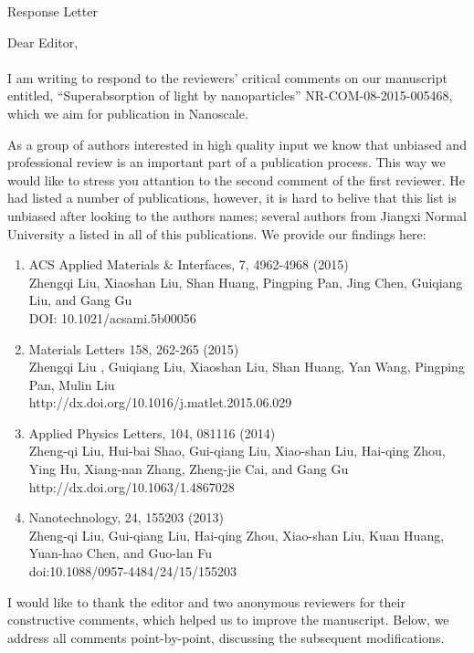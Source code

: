 \documentclass[a4paper]{article}
\begin{document}
\begin{center}
  Response Letter
\end{center}
Dear Editor,
\\
\\
I am writing to respond to the reviewers' critical comments on our
manuscript entitled, ``Superabsorption of light by nanoparticles''
NR-COM-08-2015-005468, which we aim for publication in Nanoscale.

As a group of authors interested in high quality input we know that
unbiased and professional review is an important part of a publication
process.  This way we would like to stress you attantion to the second
comment of the first reviewer. He had listed a number of publications,
however, it is hard to belive that this list is unbiased after looking
to the authors names; several authors from Jiangxi Normal University a
listed in all of this publications.  We provide our findings here:
\begin{enumerate}
\item ACS Applied Materials & Interfaces, 7, 4962-4968 (2015)\\
  Zhengqi Liu, Xiaoshan Liu,  Shan Huang,  Pingping Pan,  Jing Chen,
  Guiqiang Liu, and Gang Gu\\
  DOI: 10.1021/acsami.5b00056
\item Materials Letters 158, 262-265 (2015)\\
  Zhengqi Liu , Guiqiang Liu, Xiaoshan Liu, Shan Huang, Yan Wang,
  Pingping Pan, Mulin Liu\\
  http://dx.doi.org/10.1016/j.matlet.2015.06.029
\item Applied Physics Letters, 104, 081116 (2014)\\
  Zheng-qi Liu, Hui-bai Shao,  Gui-qiang Liu, Xiao-shan Liu, Hai-qing Zhou, Ying Hu,
  Xiang-nan Zhang, Zheng-jie Cai, and Gang Gu\\
  http://dx.doi.org/10.1063/1.4867028
\item Nanotechnology, 24, 155203 (2013)\\
  Zheng-qi Liu, Gui-qiang Liu, Hai-qing Zhou, Xiao-shan Liu,
  Kuan Huang, Yuan-hao Chen, and Guo-lan Fu\\
  doi:10.1088/0957-4484/24/15/155203
\end{enumerate}

I would like to thank the editor and two anonymous reviewers for their
constructive comments, which helped us to improve the
manuscript. Below, we address all comments point-by-point, discussing
the subsequent modifications.
\end{document}
